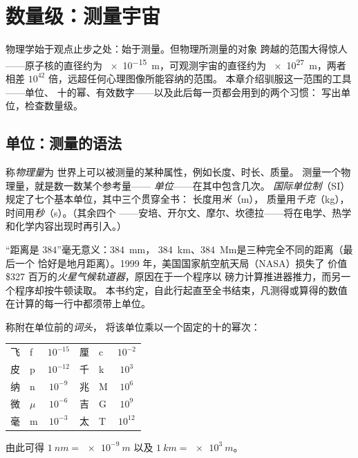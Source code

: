 \chapter{数量级：测量宇宙}\label{ch:g10:orders-of-magnitude}

物理学始于观点止步之处：始于测量。但物理所测量的对象
跨越的范围大得惊人——原子核的直径约为
\qty{e-15}{m}，可观测宇宙的直径约为 \qty{e27}{m}，两者相差
$10^{42}$ 倍，远超任何心理图像所能容纳的范围。
本章介绍驯服这一范围的工具——单位、
十的幂、有效数字——以及此后每一页都会用到的两个习惯：
写出单位，检查数量级。

\section{单位：测量的语法}

\begin{definition}[物理量与国际单位制]\label{def:g10:orders-of-magnitude:unit}
称\emph{物理量}为
世界上可以被测量的某种属性，例如长度、时长、质量。
测量一个物理量，就是数一数某个参考量——
\emph{单位}——在其中包含几次。
\emph{国际单位制}（SI）规定了七个基本单位，其中三个贯穿全书：
长度用\emph{米}（\unit{m}），
质量用\emph{千克}（\unit{kg}），
时间用\emph{秒}（\unit{s}）。（其余四个
——安培、开尔文、摩尔、坎德拉——将在电学、热学
和化学内容出现时再引入。）
\end{definition}

\begin{remark}[没有单位的数不是结果]\label{rem:g10:orders-of-magnitude:units}
“距离是 $384$”毫无意义：\qty{384}{mm}，
\qty{384}{km}、\qty{384}{Mm}是三种完全不同的距离（最后一个
恰好是地月距离）。1999 年，美国国家航空航天局（NASA）损失了
价值 \$327 百万的\emph{火星气候轨道器}，原因在于一个程序以
磅力计算推进器推力，而另一个程序却按牛顿读取。
本书约定，自此行起直至全书结束，凡测得或算得的数值
在计算的每一行中都须带上单位。
\end{remark}

\begin{definition}[国际单位制词头]\label{def:g10:orders-of-magnitude:prefixes}
称附在单位前的\emph{词头}，
将该单位乘以一个固定的十的幂次：
\begin{center}
\begin{tabular}{llc@{\qquad\qquad}llc}
飞 & f & $10^{-15}$ & 厘 & c & $10^{-2}$ \\
皮 & p & $10^{-12}$ & 千 & k & $10^{3}$  \\
纳 & n & $10^{-9}$  & 兆 & M & $10^{6}$  \\
微 & $\mu$ & $10^{-6}$ & 吉 & G & $10^{9}$ \\
毫 & m & $10^{-3}$  & 太 & T & $10^{12}$ \\
\end{tabular}
\end{center}
由此可得 $\qty{1}{nm} = \qty{e-9}{m}$ 以及 $\qty{1}{km} = \qty{e3}{m}$。
\end{definition}

